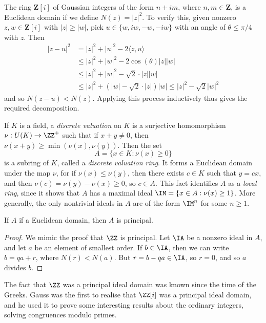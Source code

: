 \begin{example}
    The ring $\mathbf{Z}[i]$ of Gaussian integers of the form $n + im$, where $n,m \in \mathbf{Z}$, is a Euclidean domain if we define $N(z) = |z|^2$. To verify this, given nonzero $z,w \in \mathbf{Z}[i]$ with $|z| \geq |w|$, pick $u \in \{ w, iw, -w, -iw \}$ with an angle of $\theta \leq \pi/4$ with $z$. Then
    \begin{align*}
        |z - u|^2 &= |z|^2 + |u|^2 - 2 \langle z, u \rangle\\
        &\leq |z|^2 + |w|^2 - 2 \cos(\theta) |z||w|\\
        &\leq |z|^2 + |w|^2 - \sqrt{2} \cdot |z||w|\\
        &\leq |z|^2 + (|w| - \sqrt{2} \cdot |z|) |w| \leq |z|^2 - \sqrt{2} |w|^2
    \end{align*}
    and so $N(z-u) < N(z)$. Applying this process inductively thus gives the required decomposition.
\end{example}

\begin{example}
    If $K$ is a field, a \emph{discrete valuation} on $K$ is a surjective homomorphism $\nu: U(K) \to \ZZ^+$ such that if $x + y \neq 0$, then $\nu(x + y) \geq \min(\nu(x),\nu(y))$. Then the set
    \[ A = \{ x \in K: \nu(x) \geq 0 \} \]
    is a subring of $K$, called a \emph{discrete valuation ring}. It forms a Euclidean domain under the map $\nu$, for if $\nu(x) \leq \nu(y)$, then there exists $c \in K$ such that $y = cx$, and then $\nu(c) = \nu(y) - \nu(x) \geq 0$, so $c \in A$. This fact identifies $A$ as a \emph{local ring}, since it shows that $A$ has a maximal ideal $\IM = \{ x \in A: \nu(x) \geq 1 \}$. More generally, the only nontrivial ideals in $A$ are of the form $\IM^n$ for some $n \geq 1$.
\end{example}

\begin{theorem}
    If $A$ if a Euclidean domain, then $A$ is principal.
\end{theorem}
\begin{proof}
    We mimic the proof that $\ZZ$ is principal. Let $\IA$ be a nonzero ideal in $A$, and let $a$ be an element of smallest order. If $b \in \IA$, then we can write $b = qa + r$, where $N(r) < N(a)$. But $r = b - qa \in \IA$, so $r = 0$, and so $a$ divides $b$.
\end{proof}

The fact that $\ZZ$ was a principal ideal domain was known since the time of the Greeks. Gauss was the first to realise that $\ZZ[i]$ was a principal ideal domain, and he used it to prove some interesting results about the ordinary integers, solving congruences modulo primes.

